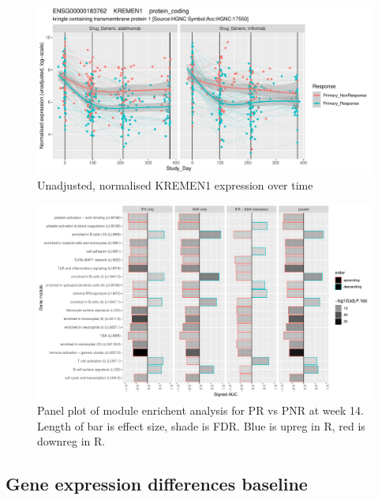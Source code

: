 \begin{outline}
\begin{figure}
    \centering
    \includegraphics[width=1.0\textwidth,page=1]{mainmatter/figures/chapter_04/dream.E_vs_Study_Day.GENEID_ENSG00000183762.SYMBOL_KREMEN1.pdf}
    \caption{Unadjusted, normalised KREMEN1 expression over time}
    \label{fig:multipants_dge_KREMEN1}
\end{figure}

\begin{figure}
    \centering
    \includegraphics[width=1.0\textwidth,page=1]{mainmatter/figures/chapter_04/plot_gene_set_enrichment.tmodCERNO_panelplot_C_3RI_3NI,C_3RA_3NA,C_(3RI_3NI)_(3RA_3NA),C_3R_3N.pdf}
    \caption{Panel plot of module enrichent analysis for PR vs PNR at week 14. Length of bar is effect size, shade is FDR. Blue is upreg in R, red is downreg in R.}
    \label{fig:multipants_dge_panelPlot_week_14_R_N}
\end{figure}


\subsection{Gene expression differences baseline}


\end{outline}
